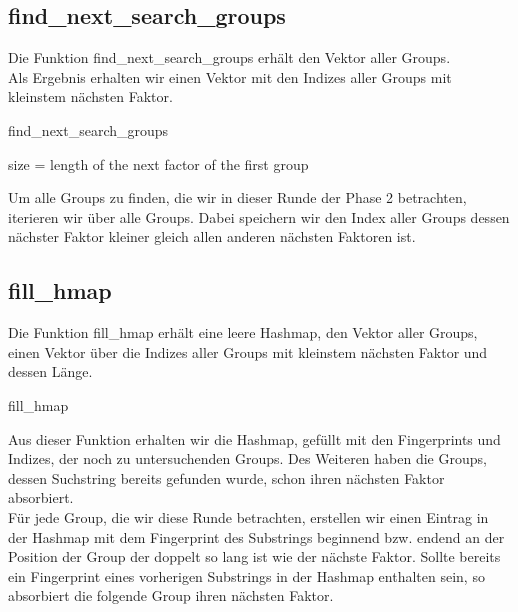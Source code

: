 \subsection{find\_next\_search\_groups}
Die Funktion find\_next\_search\_groups erhält den Vektor aller Groups.\\
Als Ergebnis erhalten wir einen Vektor mit den Indizes aller Groups mit kleinstem nächsten Faktor.\\
\begin{algorithm}[h!]
	\caption{find\_next\_search\_groups}
	size = length of the next factor of the first group\;
\end{algorithm}
\noindent
Um alle Groups zu finden, die wir in dieser Runde der Phase 2 betrachten, iterieren wir über alle Groups. Dabei speichern wir den Index aller Groups dessen nächster Faktor  kleiner gleich allen anderen nächsten Faktoren ist.

\subsection{fill\_hmap}
Die Funktion fill\_hmap erhält eine leere Hashmap, den Vektor aller Groups, einen Vektor über die Indizes aller Groups mit kleinstem nächsten Faktor und dessen Länge.
\begin{algorithm}[ht!]
	\caption{fill\_hmap}
\end{algorithm}
\noindent
Aus dieser Funktion erhalten wir die Hashmap, gefüllt mit den Fingerprints und Indizes, der noch zu untersuchenden Groups. Des Weiteren haben die Groups, dessen Suchstring bereits gefunden wurde, schon ihren nächsten Faktor absorbiert.\\
\noindent
Für jede Group, die wir diese Runde betrachten, erstellen wir einen Eintrag in der Hashmap mit dem Fingerprint des Substrings beginnend bzw. endend  an der Position der Group der doppelt so lang ist wie der nächste Faktor. Sollte bereits ein Fingerprint eines vorherigen Substrings in der Hashmap enthalten sein, so absorbiert die folgende Group ihren nächsten Faktor.


